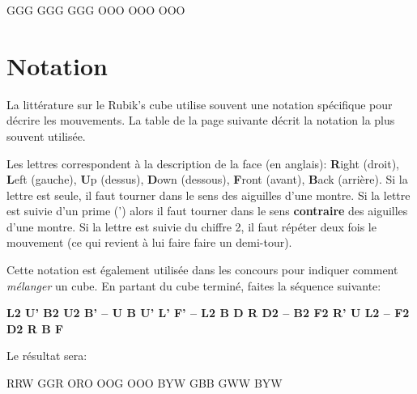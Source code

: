 \documentclass[10pt,paper=a5,pagesize]{scrbook}
\begin{document}
{
	\centering
	\RubikFaceRight%
	{G}{G}{G}%
	{G}{G}{G}%
	{G}{G}{G}
	\RubikFaceFront%
	{O}{O}{O}%
	{O}{O}{O}%
	{O}{O}{O}
	\par
}

\chapter{Notation}
La littérature sur le Rubik's cube utilise souvent une notation spécifique pour décrire les mouvements. La table de la page suivante décrit la notation la plus souvent utilisée.

Les lettres correspondent à la description de la face (en anglais): \textbf{R}ight (droit), \textbf{L}eft (gauche), \textbf{U}p (dessus), \textbf{D}own (dessous), \textbf{F}ront (avant), \textbf{B}ack (arrière).
Si la lettre est seule, il faut tourner dans le sens des aiguilles d'une montre.
Si la lettre est suivie d'un prime (') alors il faut tourner dans le sens \textbf{contraire} des aiguilles d'une montre. Si la lettre est suivie du chiffre 2, il faut répéter deux fois le mouvement (ce qui revient à lui faire faire un demi-tour).

Cette notation est également utilisée dans les concours pour indiquer comment \emph{mélanger} un cube. En partant du cube terminé, faites la séquence suivante:

\textbf{L2 U' B2 U2 B' -- U B U' L' F' -- L2 B D R D2 -- B2 F2 R' U L2 -- F2 D2 R B F}

Le résultat sera:

\begin{center}
	\RubikFaceRight%
	{R}{R}{W}%
	{G}{G}{R}%
	{O}{R}{O}
	\RubikFaceFront%
	{O}{O}{G}%
	{O}{O}{O}%
	{B}{Y}{W}
	\RubikFaceUp%
	{G}{B}{B}%
	{G}{W}{W}%
	{B}{Y}{W}
\end{center} 
\end{document}
